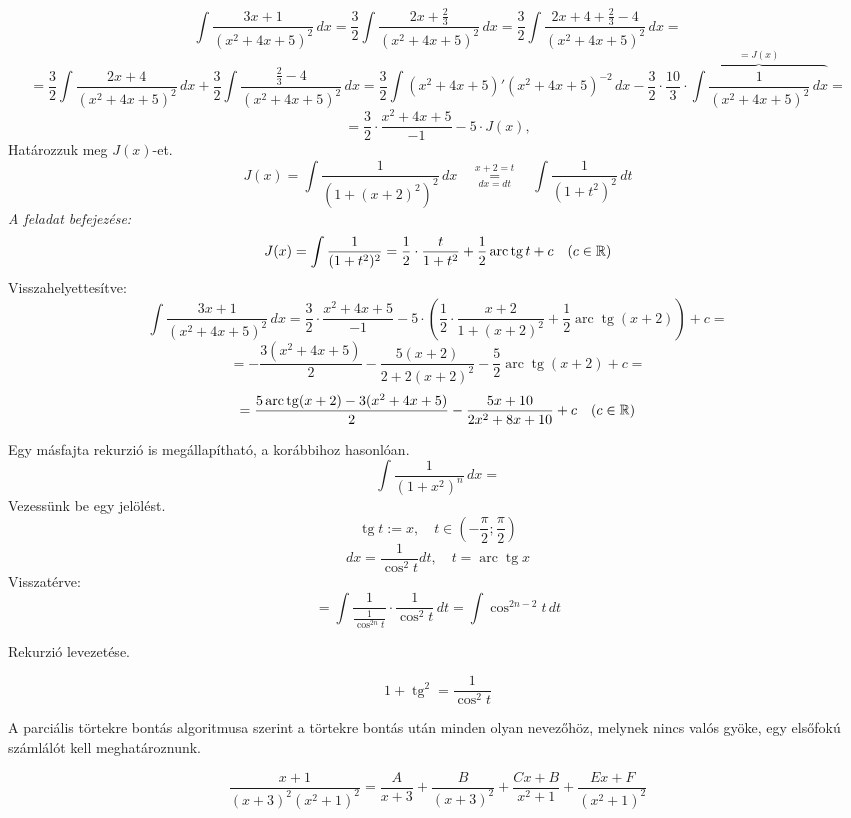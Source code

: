 \documentclass[a4paper,11.5pt]{article}
\DeclareMathOperator{\tg}{tg}
\DeclareMathOperator{\arc}{arc}
\begin{document}
	\begin{exercise}
		\[ \int\frac{3x+1}{(x^2+4x+5)^2}\,dx=\frac{3}{2}\int\frac{2x+\frac{2}{3}}{(x^2+4x+5)^2}\,dx=\frac{3}{2}\int\frac{2x+4+\frac{2}{3}-4}{(x^2+4x+5)^2}\,dx=\]
		\[=\frac{3}{2}\int\frac{2x+4}{(x^2+4x+5)^2}\,dx+\frac{3}{2}\int\frac{\frac{2}{3}-4}{(x^2+4x+5)^2}\,dx=\frac{3}{2}\int(x^2+4x+5)'(x^2+4x+5)^{-2}\,dx-\frac{3}{2}\cdot\frac{10}{3}\cdot\overbrace{\int\frac{1}{(x^2+4x+5)^2}\,dx}^{=J(x)}=\]
		\[=\frac{3}{2}\cdot\frac{x^2+4x+5}{-1}-5\cdot J(x), \]
		Határozzuk meg $J(x)$-et.
		\[J(x)=\int\frac{1}{(1+(x+2)^2)^2}\,dx\quad \overset{x+2=t}{\underset{dx=dt}{=}}\quad \int\frac{1}{(1+t^2)^2}\,dt\]
		\textit{A feladat befejezése:}
		\[ J(x) = \int\frac{1}{(1+t^2)^2}=\frac{1}{2}\cdot\frac{t}{1+t^2}+\frac{1}{2}\arc\tg t+c\quad (c\in\R) \]
		Visszahelyettesítve:
		\[\int\frac{3x+1}{(x^2+4x+5)^2}\,dx=\frac{3}{2}\cdot\frac{x^2+4x+5}{-1}-5\cdot\left(\frac{1}{2}\cdot\frac{x+2}{1+(x+2)^2}+\frac{1}{2}\arc\tg (x+2)\right)+c = \]
		\[ =-\frac{3(x^2+4x+5)}{2}-\frac{5(x+2)}{2+2(x+2)^2}-\frac{5}{2}\arc\tg(x+2) + c=\]
		\[=\frac{5\arc\tg(x+2)-3(x^2+4x+5)}{2}-\frac{5x+10}{2x^2+8x+10} + c \quad (c\in\R)\]
	\end{exercise}
	\begin{note}
		Egy másfajta rekurzió is megállapítható, a korábbihoz hasonlóan.
		\[ \int\frac{1}{(1+x^2)^n}\,dx= \]
		Vezessünk be egy jelölést.
		\[ \tg t:=x,\quad t\in\left(-\frac{\pi}{2};\frac{\pi}{2}\right) \]
		\[ dx=\frac{1}{\cos^2t}dt,\quad t=\arc\tg x \]
		Visszatérve:
		\[ =\int\frac{1}{\frac{1}{\cos^{2n}t}}\cdot\frac{1}{\cos^2t}\,dt=\int\cos^{2n-2}t\,dt \]
	\end{note}
	\begin{exercise}
		Rekurzió levezetése.
	\end{exercise}
	\begin{note}
		\[ 1+\tg^2=\frac{1}{\cos^2t} \]
	\end{note}
	\begin{note}
		A parciális törtekre bontás algoritmusa szerint a törtekre bontás után minden olyan nevezőhöz, melynek nincs valós gyöke, egy elsőfokú számlálót kell meghatároznunk.
	\end{note}
	\begin{task}
		\[ \frac{x+1}{(x+3)^2(x^2+1)^2}=\frac{A}{x+3}+\frac{B}{(x+3)^2}+\frac{Cx+B}{x^2+1}+\frac{Ex+F}{(x^2+1)^2} \]
	\end{task}
\end{document}

